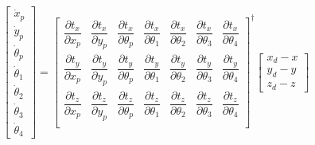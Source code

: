 \begin{equation*}
    \begin{bmatrix}
        \dot{x}_p \\
        \dot{y}_p \\
        \dot{\theta}_p \\
        \dot{\theta}_1 \\
        \dot{\theta}_2 \\
        \dot{\theta}_3 \\
        \dot{\theta}_4
    \end{bmatrix} =
    \begin{bmatrix}
        \dfrac{\partial t_x}{\partial x_p} & \dfrac{\partial t_x}{\partial y_p} & \dfrac{\partial t_x}{\partial \theta_p} & \dfrac{\partial t_x}{\partial \theta_1} & \dfrac{\partial t_x}{\partial \theta_2} & \dfrac{\partial t_x}{\partial \theta_3} & \dfrac{\partial t_x}{\partial \theta_4} \\
        \dfrac{\partial t_y}{\partial x_p} & \dfrac{\partial t_y}{\partial y_p} & \dfrac{\partial t_y}{\partial \theta_p} & \dfrac{\partial t_y}{\partial \theta_1} & \dfrac{\partial t_y}{\partial \theta_2} & \dfrac{\partial t_y}{\partial \theta_3} & \dfrac{\partial t_y}{\partial \theta_4} \\
        \dfrac{\partial t_z}{\partial x_p} & \dfrac{\partial t_z}{\partial y_p} & \dfrac{\partial t_z}{\partial \theta_p} & \dfrac{\partial t_z}{\partial \theta_1} & \dfrac{\partial t_z}{\partial \theta_2} & \dfrac{\partial t_z}{\partial \theta_3} & \dfrac{\partial t_z}{\partial \theta_4} \\
    \end{bmatrix}^\dagger
    \begin{bmatrix}
        x_d - x \\
        y_d - y \\
        z_d - z
    \end{bmatrix}
\end{equation*}

